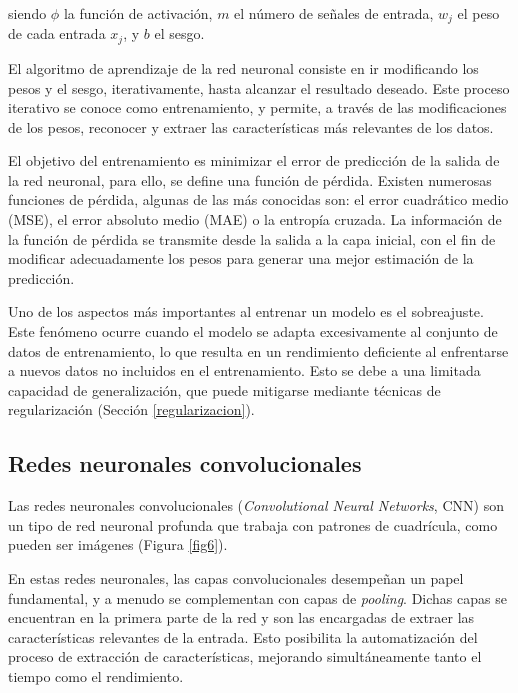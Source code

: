 siendo $\phi$ la función de activación, $m$ el número de señales de entrada, $w_j$ el peso de cada entrada $x_j$, y $b$ el sesgo.

El algoritmo de aprendizaje de la red neuronal consiste en ir modificando los pesos y el sesgo, iterativamente, hasta alcanzar el resultado deseado. Este proceso iterativo se conoce como entrenamiento, y permite, a través de las modificaciones de los pesos, reconocer y extraer las características más relevantes de los datos.

El objetivo del entrenamiento es minimizar el error de predicción de la salida de la red neuronal, para ello, se define una función de pérdida. Existen numerosas funciones de pérdida, algunas de las más conocidas son: el error cuadrático medio (MSE), el error absoluto medio (MAE) o la entropía cruzada. La información de la función de pérdida se transmite desde la salida a la capa inicial, con el fin de modificar adecuadamente los pesos para generar una mejor estimación de la predicción.

Uno de los aspectos más importantes al entrenar un modelo es el sobreajuste. Este fenómeno ocurre cuando el modelo se adapta excesivamente al conjunto de datos de entrenamiento, lo que resulta en un rendimiento deficiente al enfrentarse a nuevos datos no incluidos en el entrenamiento. Esto se debe a una limitada capacidad de generalización, que puede mitigarse mediante técnicas de regularización (Sección \ref{regularizacion}).


\subsection{Redes neuronales convolucionales}
Las redes neuronales convolucionales (\textit{Convolutional Neural Networks}, CNN) \cite{35, 36, 37} son un tipo de red neuronal profunda que trabaja con patrones de cuadrícula, como pueden ser imágenes (Figura \ref{fig6}).

En estas redes neuronales, las capas convolucionales desempeñan un papel fundamental, y a menudo se complementan con capas de \textit{pooling}. Dichas capas se encuentran en la primera parte de la red y son las encargadas de extraer las características relevantes de la entrada. Esto posibilita la automatización del proceso de extracción de características, mejorando simultáneamente tanto el tiempo como el rendimiento.

